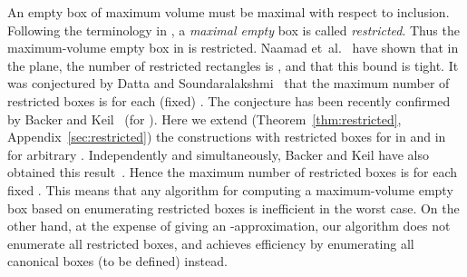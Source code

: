 \documentclass[11pt]{article}
\begin{document}
An empty box of maximum volume must be maximal with respect to inclusion. 
Following the terminology in \cite{NLH84},
a {\em maximal empty} box is called {\em restricted}. 
Thus the maximum-volume empty box in  is restricted.
Naamad et~al.\ \cite{NLH84} have shown that in the plane, the number of 
restricted rectangles is , and that this bound is tight.
It was conjectured by Datta and Soundaralakshmi~\cite{DS00} that the
maximum number of restricted boxes is  for each (fixed) .  
The conjecture has been recently confirmed by Backer and
Keil~\cite{BK09a,BK09b} (for ). 
Here we extend (Theorem~\ref{thm:restricted}, Appendix~\ref{sec:restricted})
the constructions with  restricted boxes for 
in \cite{NLH84} and  in \cite{DS00} for arbitrary . 
Independently and simultaneously, Backer and Keil have also obtained
this result~\cite{Ba09,BK09a,BK09b}. Hence the maximum number of restricted
boxes is  for each fixed .   
This means that any algorithm for computing a maximum-volume empty box 
based on enumerating restricted boxes is inefficient in the worst case.
On the other hand, at the expense of giving an -approximation, 
our algorithm does not enumerate all restricted boxes, and
achieves efficiency by enumerating all canonical boxes (to be defined)
instead.  
\end{document}
